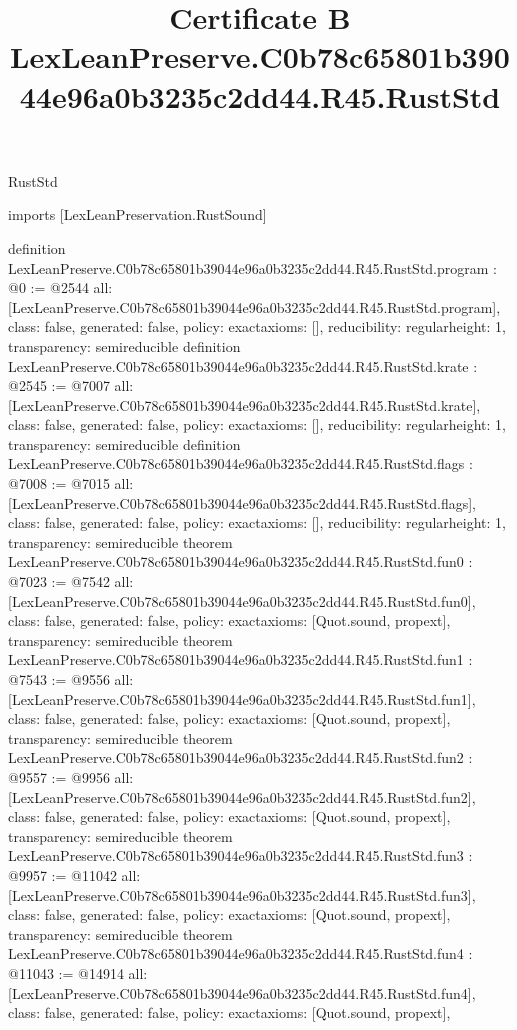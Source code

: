 \begin{lexlean}{RustStd}
\title{Certificate B LexLeanPreserve.C0b78c65801b39044e96a0b3235c2dd44.R45.RustStd}
\begin{coremodule}
imports [LexLeanPreservation.RustSound]

definition LexLeanPreserve.C0b78c65801b39044e96a0b3235c2dd44.R45.RustStd.program : @0 := @2544 {
  all: [LexLeanPreserve.C0b78c65801b39044e96a0b3235c2dd44.R45.RustStd.program],
  class: false,
  generated: false,
  policy: exact{axioms: []},
  reducibility: regular{height: 1},
  transparency: semireducible
}
definition LexLeanPreserve.C0b78c65801b39044e96a0b3235c2dd44.R45.RustStd.krate : @2545 := @7007 {
  all: [LexLeanPreserve.C0b78c65801b39044e96a0b3235c2dd44.R45.RustStd.krate],
  class: false,
  generated: false,
  policy: exact{axioms: []},
  reducibility: regular{height: 1},
  transparency: semireducible
}
definition LexLeanPreserve.C0b78c65801b39044e96a0b3235c2dd44.R45.RustStd.flags : @7008 := @7015 {
  all: [LexLeanPreserve.C0b78c65801b39044e96a0b3235c2dd44.R45.RustStd.flags],
  class: false,
  generated: false,
  policy: exact{axioms: []},
  reducibility: regular{height: 1},
  transparency: semireducible
}
theorem LexLeanPreserve.C0b78c65801b39044e96a0b3235c2dd44.R45.RustStd.fun0 : @7023 := @7542 {
  all: [LexLeanPreserve.C0b78c65801b39044e96a0b3235c2dd44.R45.RustStd.fun0],
  class: false,
  generated: false,
  policy: exact{axioms: [Quot.sound, propext]},
  transparency: semireducible
}
theorem LexLeanPreserve.C0b78c65801b39044e96a0b3235c2dd44.R45.RustStd.fun1 : @7543 := @9556 {
  all: [LexLeanPreserve.C0b78c65801b39044e96a0b3235c2dd44.R45.RustStd.fun1],
  class: false,
  generated: false,
  policy: exact{axioms: [Quot.sound, propext]},
  transparency: semireducible
}
theorem LexLeanPreserve.C0b78c65801b39044e96a0b3235c2dd44.R45.RustStd.fun2 : @9557 := @9956 {
  all: [LexLeanPreserve.C0b78c65801b39044e96a0b3235c2dd44.R45.RustStd.fun2],
  class: false,
  generated: false,
  policy: exact{axioms: [Quot.sound, propext]},
  transparency: semireducible
}
theorem LexLeanPreserve.C0b78c65801b39044e96a0b3235c2dd44.R45.RustStd.fun3 : @9957 := @11042 {
  all: [LexLeanPreserve.C0b78c65801b39044e96a0b3235c2dd44.R45.RustStd.fun3],
  class: false,
  generated: false,
  policy: exact{axioms: [Quot.sound, propext]},
  transparency: semireducible
}
theorem LexLeanPreserve.C0b78c65801b39044e96a0b3235c2dd44.R45.RustStd.fun4 : @11043 := @14914 {
  all: [LexLeanPreserve.C0b78c65801b39044e96a0b3235c2dd44.R45.RustStd.fun4],
  class: false,
  generated: false,
  policy: exact{axioms: [Quot.sound, propext]},
}
\end{coremodule}
\end{lexlean}
